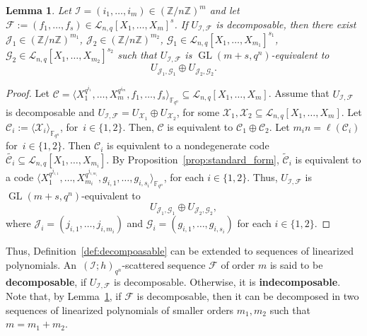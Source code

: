 \documentclass[11pt]{article}
\newtheorem{lemma}[theo]{Lemma}
\theoremstyle{definition}
\numberwithin{equation}{section}
\DeclareMathOperator{\GL}{GL}
\begin{document}
\begin{lemma}\label{lem:decomposable}
    Let $\mathcal I=(i_1,\ldots,i_m)\in(\mathbb{Z}/n\mathbb{Z})^m$ and let $\mathcal{F}:=(f_1,\ldots,f_s)\in\mathcal{L}_{n,q}[X_1,\ldots,X_m]^s$.
    If $U_{\mathcal I,\mathcal F}$ is decomposable, then there exist $\mathcal J_1 \in (\mathbb{Z}/n\mathbb{Z})^{m_1}$, $\mathcal J_2 \in (\mathbb{Z}/n\mathbb{Z})^{m_2}$, $\mathcal G_1\in\mathcal{L}_{n,q}[X_1,\ldots,X_{m_1}]^{s_1}$, $\mathcal G_2\in\mathcal{L}_{n,q}[X_{1},\ldots,X_{m_2}]^{s_2}$ such that $U_{\mathcal I,\mathcal F}$ is $\GL(m+s,q^n)$-equivalent to
    $$ U_{\mathcal J_1,\mathcal G_1}\oplus U_{\mathcal J_2,\mathcal G_2}.$$
\end{lemma}
\begin{proof}
    Let $\mathcal{C}=\langle X_1^{q^{i_1}},\ldots,X_m^{q^{i_m}},f_1,\ldots,f_s\rangle_{{\mathbb F}_{q^n}}\subseteq \mathcal{L}_{n,q}[X_1,\ldots,X_m]$. Assume that $U_{\mathcal I,\mathcal F}$ is decomposable and $U_{\mathcal I,\mathcal F}=U_{\mathcal X_1}\oplus U_{\mathcal X_2}$,
    for some $\mathcal X_1, \mathcal X_2\subseteq \mathcal{L}_{n,q}[X_1,\ldots,X_m]$. Let $\mathcal{C}_i:=\langle \mathcal X_i\rangle_{{\mathbb F}_{q^n}}$, for~$i\in\{1,2\}$. Then, $\mathcal{C}$ is equivalent to $\mathcal{C}_1\oplus \mathcal{C}_2$. Let $m_in=\ell(\mathcal{C}_i)$ for~$i\in\{1,2\}$. Then $\mathcal{C}_i$ is equivalent to a nondegenerate code $\tilde{\mathcal{C}_i}\subseteq \mathcal{L}_{n,q}[X_1,\ldots,X_{m_i}]$. By Proposition~\ref{prop:standard_form}, $\tilde{\mathcal{C}}_i$ is equivalent to a code $\langle X_1^{q^{j_{i,1}}},\ldots,X_{m_i}^{q^{j_{i,m_i}}},g_{i,1},\ldots,g_{i,s_i}\rangle_{{\mathbb F}_{q^n}}$, for each $i\in\{1,2\}$. Thus, 
    $ U_{\mathcal I,\mathcal F}$ is $\GL(m+s,q^n)$-equivalent to $$U_{\mathcal J_1,\mathcal G_1}\oplus U_{\mathcal J_2,\mathcal G_2},$$
    where $\mathcal J_i=(j_{i,1},\ldots,j_{i,m_i})$ and $\mathcal G_i=(g_{i,1},\ldots,g_{i,s_i})$ for each $i\in\{1,2\}$. 
\end{proof}

Thus, Definition~\ref{def:decompoasable} can be extended to sequences of linearized polynomials. An~$(\mathcal I;h)_{q^n}$-scattered sequence $\mathcal F$ of order $m$ is said to be \textbf{decomposable}, if $U_{\mathcal I,\mathcal F}$ is decomposable. Otherwise, it is \textbf{indecomposable}. Note that, by Lemma~\ref{lem:decomposable}, if  $\mathcal F$ is decomposable, then it can be decomposed in two sequences of linearized polynomials of smaller orders $m_1,m_2$ such that $m=m_1+m_2$.
\end{document}
